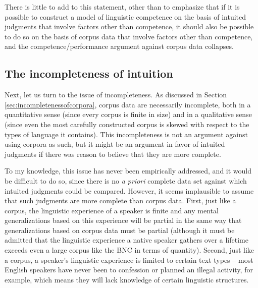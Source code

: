 There is little to add to this statement, other than to emphasize that if it is possible to construct a model of linguistic competence on the basis of intuited judgments that involve factors other than competence, it should also be possible to do so on the basis of corpus data that involve factors other than competence, and the competence/performance argument against corpus data collapses.

\subsection{The incompleteness of intuition}
\label{sec:incompletenessofintuition}

Next, let us turn to the issue of incompleteness. As discussed in Section \ref{sec:incompletenessofcorpora}, corpus data are necessarily incomplete, both in a quantitative sense (since every corpus is finite in size) and in a qualitative sense (since even the most carefully constructed corpus is skewed with respect to the types of language it contains). This incompleteness is not an argument against using corpora as such, but it might be an argument in favor of intuited judgments if there was reason to believe that they are more complete.

To my knowledge, this issue has never been empirically addressed, and it would be difficult to do so, since there is no \emph{a priori} complete data set against which intuited judgments could be compared. However, it seems implausible to assume that such judgments are more complete than corpus data. First, just like a corpus, the linguistic experience of a speaker is finite and any mental generalizations based on this experience will be partial in the same way that generalizations based on corpus data must be partial (although it must be admitted that the linguistic experience a native speaker gathers over a lifetime exceeds even a large corpus like the BNC in terms of quantity). Second, just like a corpus, a speaker's linguistic experience is limited to certain text types -- most English speakers have never been to confession or planned an illegal activity, for example, which means they will lack knowledge of certain linguistic structures.

